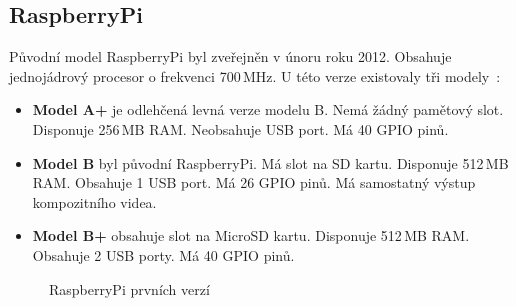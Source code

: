 	\subsection{RaspberryPi}
	Původní model RaspberryPi byl zveřejněn v únoru roku 2012. Obsahuje jednojádrový procesor o frekvenci 700\,MHz. U této verze existovaly tři modely~\cite{RaspiOne}:
	
		\begin{itemize}
		\item \textbf{Model A+} je odlehčená levná verze modelu B. Nemá žádný pamětový slot. Disponuje 256\,MB RAM. Neobsahuje USB port. Má 40 GPIO pinů.
		\item \textbf{Model B} byl původní RaspberryPi. Má slot na SD kartu. Disponuje 512\,MB RAM. Obsahuje 1 USB port. Má 26 GPIO pinů. Má samostatný výstup kompozitního videa.
		\item \textbf{Model B+} obsahuje slot na MicroSD kartu. Disponuje 512\,MB RAM. Obsahuje 2 USB porty. Má 40 GPIO pinů.
	\end{itemize}
	
\begin{figure}[!ht]
    \centering
			\hspace*{2mm}
			\hspace*{2mm}
		\caption{RaspberryPi prvních verzí}
\end{figure}
	
